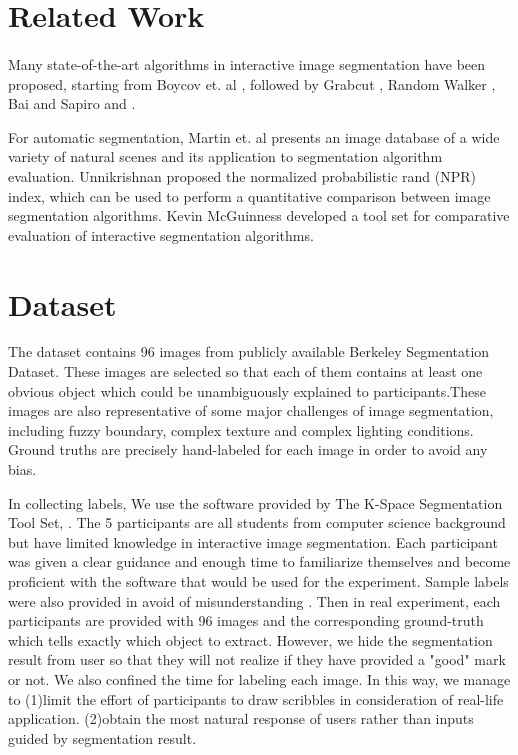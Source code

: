 \documentclass[runningheads,a4paper]{llncs}
\begin{document}
\section{Related Work}

\paragraph{}Many state-of-the-art algorithms in interactive image segmentation have been proposed, starting from Boycov et. al \citep{boykov2001interactive}, followed by Grabcut \citep{rother2004grabcut}, Random Walker \citep{grady2006random}, Bai and Sapiro \citep{bai2007geodesic} and \citep{gulshan2010geodesic}.

For automatic segmentation, Martin et. al  \citep{martin2001database} presents an image database of a wide variety of natural scenes and its application to segmentation algorithm evaluation.  Unnikrishnan \citep{unnikrishnan2007toward} proposed the normalized probabilistic rand (NPR) index, which can be used to perform a quantitative comparison between image segmentation algorithms. Kevin McGuinness \citep{mcguinness2010comparative} developed a tool set for comparative evaluation of interactive segmentation algorithms.

\section{Dataset}
The dataset contains 96 images from publicly available Berkeley Segmentation Dataset\citep{martin2001database}. These images are selected so that each of them contains at least one obvious object which could be unambiguously explained to participants.These images are also representative of some major challenges of image segmentation, including fuzzy boundary, complex texture and complex lighting conditions. Ground truths are precisely hand-labeled for each image in order to avoid any bias.

In collecting labels, We use the software provided by The K-Space Segmentation Tool Set, \citep{mcguinness2008k}. The 5 participants are all students from computer science background but have limited knowledge in interactive image segmentation. Each participant was given a clear guidance and enough time to familiarize themselves and become proficient with the software that would be used for the experiment. Sample labels were also provided in avoid of misunderstanding . Then in real experiment, each participants are provided with 96 images and the corresponding ground-truth which tells exactly which object to extract. However, we hide the segmentation result from user so that they will not realize if they have provided a "good" mark or not. We also confined the time for labeling each image. In this way, we manage to (1)limit the effort of participants to draw scribbles in consideration of real-life application.
(2)obtain the most natural response of users rather than inputs guided by segmentation result.
\end{document}

